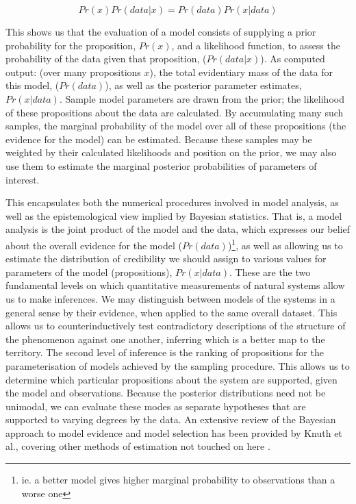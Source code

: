 \[Pr(x)Pr(data|x) = Pr(data)Pr(x|data)\]

This shows us that the evaluation of a model consists of supplying a prior probability for the proposition, $Pr(x)$, and a likelihood function, to assess the probability of the data given that proposition, ($Pr(data|x)$). As computed output: (over many propositions $x$), the total evidentiary mass of the data for this model, ($Pr(data)$), as well as the posterior parameter estimates, $Pr(x|data)$. Sample model parameters are drawn from the prior; the likelihood of these propositions about the data are calculated. By accumulating many such samples, the marginal probability of the model over all of these propositions (the evidence for the model) can be estimated. Because these samples may be weighted by their calculated likelihoods and position on the prior, we may also use them to estimate the marginal posterior probabilities of parameters of interest. 

This encapsulates both the numerical procedures involved in model analysis, as well as the epistemological view implied by Bayesian statistics. That is, a model analysis is the joint product of the model and the data, which expresses our belief about the overall evidence for the model ($Pr(data)$)\footnote{ie. a better model gives higher marginal probability to observations than a worse one}, as well as allowing us to estimate the distribution of credibility we should assign to various values for parameters of the model (propositions), $Pr(x|data)$. These are the two fundamental levels on which quantitative measurements of natural systems allow us to make inferences. We may distinguish between models of the systems in a general sense by their evidence, when applied to the same overall dataset. This allows us to counterinductively test contradictory descriptions of the structure of the phenomenon against one another, inferring which is a better map to the territory. The second level of inference is the ranking of propositions for the parameterisation of models achieved by the sampling procedure. This allows us to determine which particular propositions about the system are supported, given the model and observations. Because the posterior distributions need not be unimodal, we can evaluate these modes as separate hypotheses that are supported to varying degrees by the data. An extensive review of the Bayesian approach to model evidence and model selection has been provided by Knuth et al., covering other methods of estimation not touched on here \cite{Knuth2015}.

